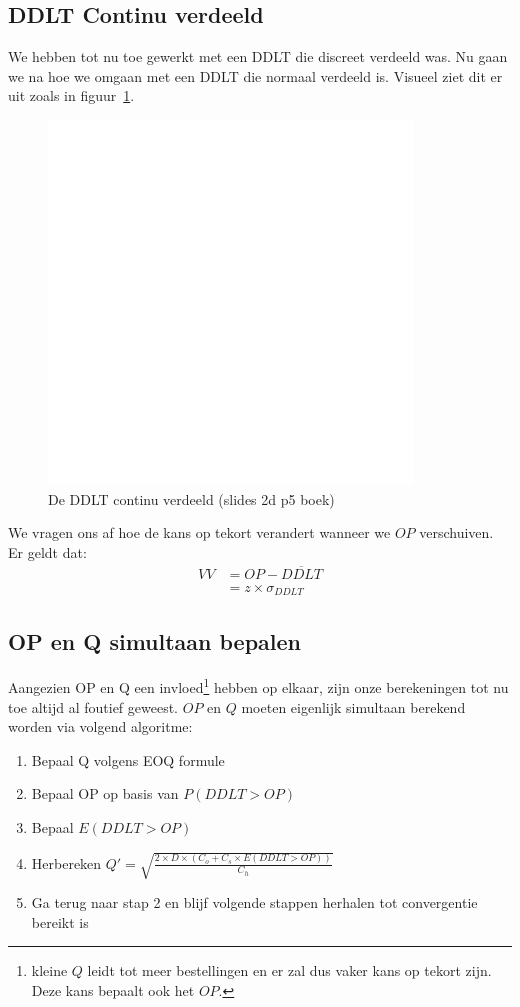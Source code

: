\subsection{DDLT Continu verdeeld}
\label{sub:DDLT Continu verdeeld}
We hebben tot nu toe gewerkt met een DDLT die discreet verdeeld was. Nu gaan we na hoe we omgaan met een DDLT die normaal verdeeld is. Visueel ziet dit er uit zoals in figuur~\ref{fig:DDLTContinuVerdeeld}.
\begin{figure}[htbp]
    \centering
    \includegraphics[scale=0.4]{Images/white.png}
    \caption{De DDLT continu verdeeld (slides 2d p5 boek)}
    \label{fig:DDLTContinuVerdeeld}
\end{figure}
We vragen ons af hoe de kans op tekort verandert wanneer we $OP$ verschuiven. Er geldt dat:
\begin{align*}
    VV &= OP - \overline{DDLT} \\
    &= z \times \sigma_{DDLT}
\end{align*}

\subsection{OP en Q simultaan bepalen}
\label{sub:OP en Q simultaan bepalen}
Aangezien OP en Q een invloed\footnote{kleine $Q$ leidt tot meer bestellingen en er zal dus vaker kans op tekort zijn. Deze kans bepaalt ook het $OP$.} hebben op elkaar, zijn onze berekeningen tot nu toe altijd al foutief geweest. $OP$ en $Q$ moeten eigenlijk simultaan berekend worden via volgend algoritme:
\begin{enumerate}
    \item Bepaal Q volgens EOQ formule
    \item Bepaal OP op basis van $P(DDLT > OP)$
    \item Bepaal $E(DDLT > OP)$
    \item Herbereken $Q' = \sqrt{ \frac{2\times D \times ( C_o + C_s \times E(DDLT > OP))}{C_h} }$
    \item Ga terug naar stap 2 en blijf volgende stappen herhalen tot convergentie bereikt is
\end{enumerate}

